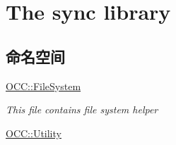 \hypertarget{group__libsync}{}\section{The sync library}
\label{group__libsync}
\subsection*{命名空间}
\begin{DoxyCompactItemize}
\item 
 \hyperlink{namespace_o_c_c_1_1_file_system}{O\+C\+C\+::\+File\+System}
\begin{DoxyCompactList}\small\item\em This file contains file system helper \end{DoxyCompactList}\item 
 \hyperlink{namespace_o_c_c_1_1_utility}{O\+C\+C\+::\+Utility}
\end{DoxyCompactItemize}
